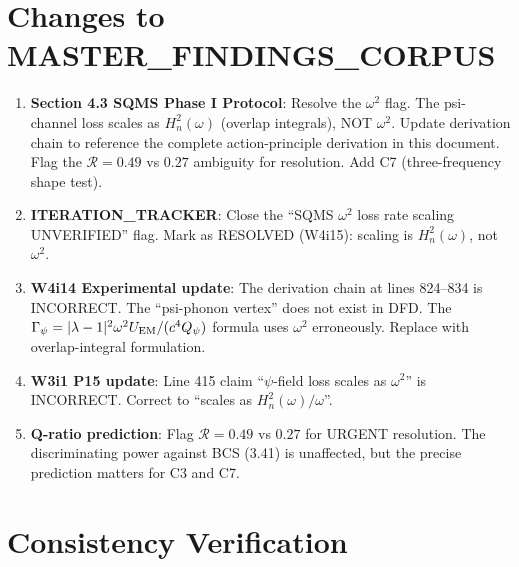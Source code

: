 \documentclass[11pt]{article}
\newcommand{\Qpsi}{Q_\psi}
\newcommand{\Heff}{H_n}
\theoremstyle{definition}
\theoremstyle{remark}
\begin{document}
\section{Changes to MASTER\_FINDINGS\_CORPUS}

\begin{enumerate}
\item \textbf{Section 4.3 SQMS Phase I Protocol}: Resolve the
  $\omega^2$ flag. The psi-channel loss scales as $\Heff^2(\omega)$
  (overlap integrals), NOT $\omega^2$. Update derivation chain to
  reference the complete action-principle derivation in this document.
  Flag the $\mathcal{R} = 0.49$ vs $0.27$ ambiguity for resolution.
  Add C7 (three-frequency shape test).

\item \textbf{ITERATION\_TRACKER}: Close the ``SQMS $\omega^2$ loss
  rate scaling UNVERIFIED'' flag. Mark as RESOLVED (W4i15): scaling
  is $\Heff^2(\omega)$, not $\omega^2$.

\item \textbf{W4i14 Experimental update}: The derivation chain at
  lines 824--834 is INCORRECT. The ``psi-phonon vertex'' does not
  exist in DFD. The $\Gamma_\psi = |\lambda-1|^2\omega^2 U_{\rm EM}
  /(c^4 \Qpsi)$ formula uses $\omega^2$ erroneously. Replace with
  overlap-integral formulation.

\item \textbf{W3i1 P15 update}: Line 415 claim ``$\psi$-field loss
  scales as $\omega^2$'' is INCORRECT. Correct to ``scales as
  $\Heff^2(\omega)/\omega$''.

\item \textbf{Q-ratio prediction}: Flag $\mathcal{R} = 0.49$ vs
  $0.27$ for URGENT resolution. The discriminating power against
  BCS (3.41) is unaffected, but the precise prediction matters for
  C3 and C7.
\end{enumerate}


\section{Consistency Verification}
\end{document}
